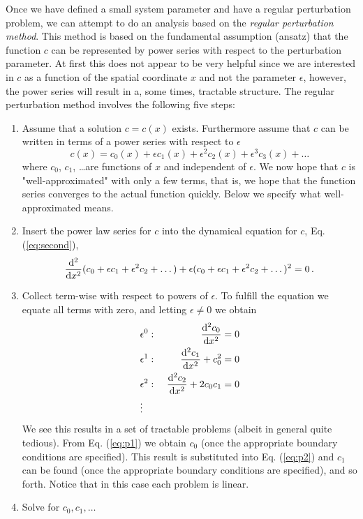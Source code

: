Once we have defined a small system parameter and have a regular perturbation problem, 
we can attempt to do an analysis based on the \emph{regular perturbation method}. 
This method is based on the fundamental assumption (ansatz) that the function
$c$ can be represented by power series with respect to the perturbation parameter. 
At first this does not appear to be very helpful since we are interested in $c$ as a
function of the spatial coordinate $x$ and not the parameter $\epsilon$,
however, the power series will result in a, some times, tractable structure. The
regular perturbation method involves the following five steps:


\begin{enumerate}
\item{Assume that a solution $c=c(x)$ exists. Furthermore assume that $c$ can
    be written in terms of a power series with respect to $\epsilon$
    \begin{equation}
      \label{eq:pertass1}
		c(x) = c_0(x) + \epsilon c_1(x) + \epsilon^2 c_2(x) + \epsilon^3c_3(x) + \ldots
    \end{equation}
    where $c_0$, $c_1$, \ldots are functions of $x$ and independent of
    $\epsilon$. We now hope that $c$ is "well-approximated" with only a 
    few terms, that is, we hope that the function series converges to
    the actual function quickly. Below we specify what well-approximated 
	means.
  }
\item{ 
    Insert the power law series for $c$ into the dynamical equation for $c$,
    Eq. (\ref{eq:second}),
    \begin{eqnarray}
      \frac{\mathrm{d}^2}{\mathrm{d} x^2} (c_0 + \epsilon c_1 + \epsilon^2 c_2 + \dots) +
      \epsilon(c_0 + \epsilon c_1 + \epsilon^2 c_2 + \dots)^2 = 0  \, .
    \end{eqnarray}
  }
\item{
    Collect term-wise with respect to powers of $\epsilon$. To fulfill the
	equation we equate all terms with zero, and letting $\epsilon \neq 0$ we
		obtain	
    \begin{eqnarray}
      &\epsilon^0:& \ \frac{\mathrm{d}^2 c_0}{\mathrm{d} x^2} = 0 \label{eq:p1}\\
      &\epsilon^1:& \ \frac{\mathrm{d}^2 c_1}{\mathrm{d} x^2} + c_0^2 = 0  \label{eq:p2}
      \\
      &\epsilon^2:& \ \frac{\mathrm{d}^2 c_2}{\mathrm{d} x^2} + 2c_0c_1 = 0 \\
      &\vdots& \nonumber
    \end{eqnarray}
		We see this results in a set of tractable problems (albeit in general quite tedious).
	    From Eq. (\ref{eq:p1}) we obtain $c_0$
   		(once the appropriate boundary conditions are specified). This
    result is substituted into Eq. (\ref{eq:p2}) and $c_1$ can be found
    (once the appropriate boundary conditions are specified), and so
    forth. Notice that in this case each problem is linear.
  }
\item{
    Solve for $c_0, c_1, \ldots$
    
}
\end{enumerate}
